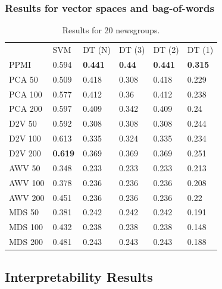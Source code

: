\subsubsection{Results for vector spaces and bag-of-words}
\begin{table}[]
	\begin{tabular}{llllll}
		& SVM   & DT (N) & DT (3) & DT (2) & DT (1) \\
		PPMI           & 0.594 & \textbf{0.441}  & \textbf{0.44}   & \textbf{0.441}  & \textbf{0.315}  \\
		PCA 50         & 0.509 & 0.418  & 0.308  & 0.418  & 0.229  \\
		PCA 100        & 0.577 & 0.412  & 0.36   & 0.412  & 0.238  \\
		PCA 200        & 0.597 & 0.409  & 0.342  & 0.409  & 0.24   \\
		D2V 50         & 0.592 & 0.308  & 0.308  & 0.308  & 0.244  \\
		D2V 100        & 0.613 & 0.335  & 0.324  & 0.335  & 0.234  \\
		D2V 200        & \textbf{0.619} & 0.369  & 0.369  & 0.369  & 0.251  \\
		AWV 50         & 0.348 & 0.233  & 0.233  & 0.233  & 0.213  \\
		AWV 100        & 0.378 & 0.236  & 0.236  & 0.236  & 0.208  \\
		AWV 200        & 0.451 & 0.236  & 0.236  & 0.236  & 0.22   \\
		MDS 50         & 0.381 & 0.242  & 0.242  & 0.242  & 0.191  \\
		MDS 100        & 0.432 & 0.238  & 0.238  & 0.238  & 0.148  \\
		MDS 200        & 0.481 & 0.243  & 0.243  & 0.243  & 0.188 
	\end{tabular}
	\caption{Results for 20 newsgroups.}
	\label{table:Newsgroups}
\end{table}


\subsection{Interpretability Results}
